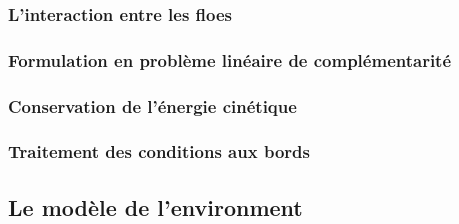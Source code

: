 \subsubsection{L'interaction entre les floes}

\subsubsection{Formulation en problème linéaire de complémentarité}

\subsubsection{Conservation de l'énergie cinétique}

\subsubsection{Traitement des conditions aux bords}

\subsection{Le modèle de l'environment}



